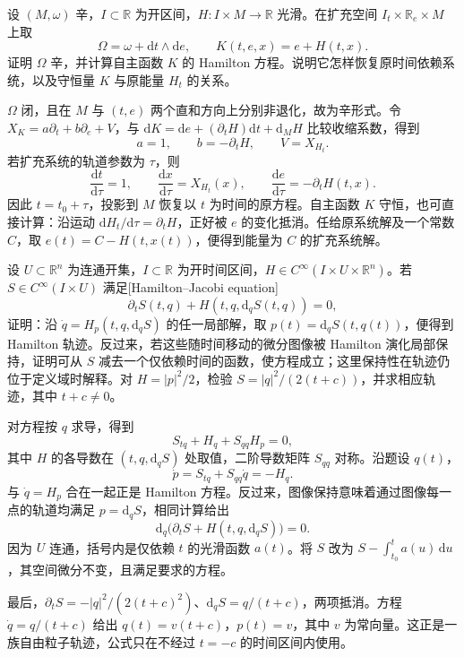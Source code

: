\BookExercises
\begin{exercise}\label{g4:ex:0901:extended-phase}
	设 \((M,\omega)\) 辛，\(I\subset\mathbb R\) 为开区间，\(H:I\times M\to\mathbb R\) 光滑。在扩充空间 \(I_t\times\mathbb R_e\times M\) 上取
	\[
		\Omega=\omega+\mathrm{d}t\wedge\mathrm{d}e,
		\qquad K(t,e,x)=e+H(t,x).
	\]
	证明 \(\Omega\) 辛，并计算自主函数 \(K\) 的 Hamilton 方程。说明它怎样恢复原时间依赖系统，以及守恒量 \(K\) 与原能量 \(H_t\) 的关系。
\end{exercise}
\begin{solution}
	\(\Omega\) 闭，且在 \(M\) 与 \((t,e)\) 两个直和方向上分别非退化，故为辛形式。令 \(X_K=a\partial_t+b\partial_e+V\)，与 \(\mathrm{d}K=\mathrm{d}e+(\partial_tH)\mathrm{d}t+\mathrm{d}_MH\) 比较收缩系数，得到
	\[
		a=1,\qquad b=-\partial_tH,\qquad V=X_{H_t}.
	\]
	若扩充系统的轨道参数为 \(\tau\)，则
	\[
		\frac{\mathrm{d}t}{\mathrm{d}\tau}=1,\qquad
		\frac{\mathrm{d}x}{\mathrm{d}\tau}=X_{H_t}(x),\qquad
		\frac{\mathrm{d}e}{\mathrm{d}\tau}=-\partial_tH(t,x).
	\]
	因此 \(t=t_0+\tau\)，投影到 \(M\) 恢复以 \(t\) 为时间的原方程。自主函数 \(K\) 守恒，也可直接计算：沿运动 \(\mathrm{d}H_t/\mathrm{d}\tau=\partial_tH\)，正好被 \(e\) 的变化抵消。任给原系统解及一个常数 \(C\)，取 \(e(t)=C-H(t,x(t))\)，便得到能量为 \(C\) 的扩充系统解。
\end{solution}

\begin{exercise}\label{g4:ex:0901:hamilton-jacobi}
	设 \(U\subset\mathbb R^n\) 为连通开集，\(I\subset\mathbb R\) 为开时间区间，\(H\in C^\infty(I\times U\times\mathbb R^n)\)。若 \(S\in C^\infty(I\times U)\) 满足[Hamilton--Jacobi equation]
	\[
		\partial_tS(t,q)+H(t,q,\mathrm{d}_qS(t,q))=0,
	\]
	证明：沿 \(\dot q=H_p(t,q,\mathrm{d}_qS)\) 的任一局部解，取 \(p(t)=\mathrm{d}_qS(t,q(t))\)，便得到 Hamilton 轨迹。反过来，若这些随时间移动的微分图像被 Hamilton 演化局部保持，证明可从 \(S\) 减去一个仅依赖时间的函数，使方程成立；这里保持性在轨迹仍位于定义域时解释。对 \(H=|p|^2/2\)，检验 \(S=|q|^2/(2(t+c))\)，并求相应轨迹，其中 \(t+c\ne0\)。
\end{exercise}
\begin{solution}
	对方程按 \(q\) 求导，得到
	\[
		S_{tq}+H_q+S_{qq}H_p=0,
	\]
	其中 \(H\) 的各导数在 \((t,q,\mathrm{d}_qS)\) 处取值，二阶导数矩阵 \(S_{qq}\) 对称。沿题设 \(q(t)\)，
	\[
		\dot p=S_{tq}+S_{qq}\dot q=-H_q.
	\]
	与 \(\dot q=H_p\) 合在一起正是 Hamilton 方程。反过来，图像保持意味着通过图像每一点的轨道均满足 \(p=\mathrm{d}_qS\)，相同计算给出
	\[
		\mathrm{d}_q\bigl(\partial_tS+H(t,q,\mathrm{d}_qS)\bigr)=0.
	\]
	因为 \(U\) 连通，括号内是仅依赖 \(t\) 的光滑函数 \(a(t)\)。将 \(S\) 改为 \(S-\int_{t_0}^t a(u)\,\mathrm{d}u\)，其空间微分不变，且满足要求的方程。

	最后，\(\partial_tS=-|q|^2/(2(t+c)^2)\)、\(\mathrm{d}_qS=q/(t+c)\)，两项抵消。方程 \(\dot q=q/(t+c)\) 给出 \(q(t)=v(t+c)\)，\(p(t)=v\)，其中 \(v\) 为常向量。这正是一族自由粒子轨迹，公式只在不经过 \(t=-c\) 的时间区间内使用。
\end{solution}

